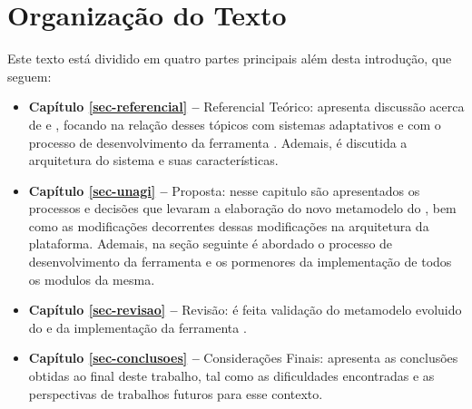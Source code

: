 \section{Organização do Texto}
\label{sec-intro-organizacao}

Este texto está dividido em quatro partes principais além desta introdução, que seguem:

\begin{itemize}
	\item \textbf{Capítulo \ref{sec-referencial} --} Referencial Teórico: apresenta discussão acerca de \gore e \mdd,  focando na relação desses tópicos com sistemas adaptativos e com o processo de desenvolvimento da ferramenta \unagi. Ademais, é discutida a arquitetura do sistema \zanshin e suas características.
	
	\item \textbf{Capítulo \ref{sec-unagi} --} Proposta: nesse capitulo são apresentados os processos e decisões que levaram a elaboração do novo metamodelo do \zanshin, bem como as modificações decorrentes dessas modificações na arquitetura da plataforma. Ademais, na seção seguinte é abordado o processo de desenvolvimento da ferramenta \unagi e os pormenores da implementação de todos os modulos da mesma.
	
	\item \textbf{Capítulo \ref{sec-revisao} --} Revisão: é feita validação do metamodelo evoluido do \zanshin e da implementação da ferramenta \unagi.
	
	\item \textbf{Capítulo \ref{sec-conclusoes} --} Considerações Finais: apresenta as conclusões obtidas ao final deste trabalho, tal como as dificuldades encontradas e as perspectivas de trabalhos futuros para esse contexto.
\end{itemize}









